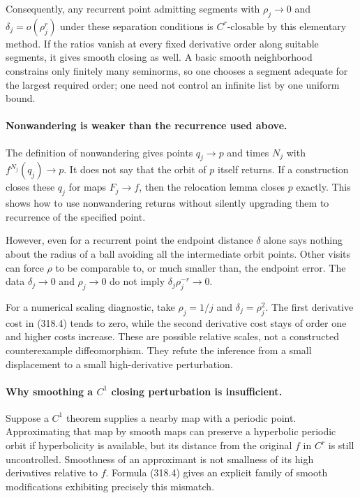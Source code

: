 \documentclass[11pt]{article}
\begin{document}
Consequently, any recurrent point admitting segments with
$\rho_j\to0$ and $\delta_j=o(\rho_j^r)$ under these separation
conditions is $C^r$-closable by this elementary method. If the ratios
vanish at every fixed derivative order along suitable segments, it
gives smooth closing as well. A basic smooth neighborhood constrains
only finitely many seminorms, so one chooses a segment adequate for
the largest required order; one need not control an infinite list
by one uniform bound.

\paragraph{Nonwandering is weaker than the recurrence used above.}
The definition of nonwandering gives points $q_j\to p$ and times
$N_j$ with $f^{N_j}(q_j)\to p$. It does not say that the orbit of
$p$ itself returns. If a construction closes these $q_j$ for maps
$F_j\to f$, then the relocation lemma closes $p$ exactly. This
shows how to use nonwandering returns without silently upgrading
them to recurrence of the specified point.

However, even for a recurrent point the endpoint distance $\delta$
alone says nothing about the radius of a ball avoiding all the
intermediate orbit points. Other visits can force $\rho$ to be
comparable to, or much smaller than, the endpoint error. The data
$\delta_j\to0$ and $\rho_j\to0$ do not imply
$\delta_j\rho_j^{-r}\to0$.

For a numerical scaling diagnostic, take $\rho_j=1/j$ and
$\delta_j=\rho_j^2$. The first derivative cost in (318.4) tends
to zero, while the second derivative cost stays of order one and
higher costs increase. These are possible relative scales, not a
constructed counterexample diffeomorphism. They refute the inference
from a small displacement to a small high-derivative perturbation.

\paragraph{Why smoothing a $C^1$ closing perturbation is insufficient.}
Suppose a $C^1$ theorem supplies a nearby map with a periodic point.
Approximating that map by smooth maps can preserve a hyperbolic
periodic orbit if hyperbolicity is available, but its distance from
the original $f$ in $C^r$ is still uncontrolled. Smoothness of an
approximant is not smallness of its high derivatives relative to $f$.
Formula (318.4) gives an explicit family of smooth modifications
exhibiting precisely this mismatch.
\end{document}
